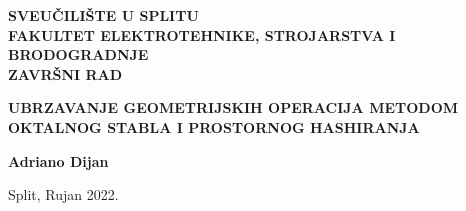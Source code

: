 \documentclass[croatian, 12pt]{report}
\begin{document}
\pagestyle{empty}
\begin{titlepage}
    {
        \fontsize{18}{21}\selectfont
        \begin{center}
            \MakeUppercase{
                \textbf{
                    Sveučilište u Splitu\\
                    Fakultet elektrotehnike, strojarstva i brodogradnje\\
                }
            }
            \vspace{4cm}
            \MakeUppercase{\textbf{Završni rad}}
        \end{center}
    }
    \vspace{2cm}
    {\fontsize{22}{26}\selectfont
        \begin{center}
            \MakeUppercase{
                \textbf{
                    Ubrzavanje geometrijskih operacija metodom
                    oktalnog stabla i prostornog hashiranja
                }
            }
        \end{center}
    }
    \vspace{4cm}
    {\fontsize{18}{21}\selectfont
        \begin{center}
            \textbf{Adriano Dijan}
        \end{center}
    }
    \vspace{2cm}
    {\fontsize{16}{19}\selectfont
        \begin{center}
            Split, Rujan 2022.
        \end{center}
    }
    
\end{titlepage}





\tableofcontents
\restoregeometry

\pagestyle{plain}







\printbibliography[heading=bibintoc, title=Literatura]

\end{document}
